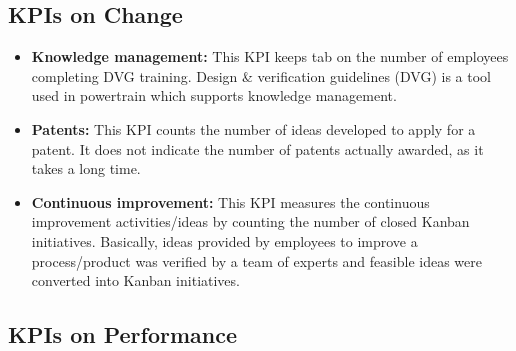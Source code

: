 \subsection{KPIs on Change}
\begin{itemize}
    \item \textbf{Knowledge management:} This KPI keeps tab on the number of employees completing DVG training. Design & verification guidelines (DVG) is a tool used in powertrain which supports knowledge management.\\ 

    \item \textbf{Patents:}
    This KPI counts the number of ideas developed to apply for a patent. It does not indicate the number of patents actually awarded, as it takes a long time.\\

     \item \textbf{Continuous improvement:}
    This KPI measures the continuous improvement activities/ideas by counting the number of closed Kanban initiatives. Basically, ideas provided by employees to improve a process/product was verified by a team of experts and feasible ideas were converted into Kanban initiatives.\\
\end{itemize}


\subsection{KPIs on Performance}

